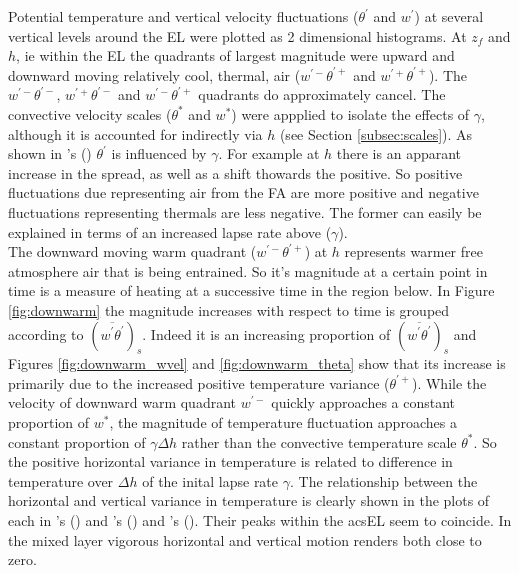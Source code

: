 Potential temperature and vertical velocity fluctuations ($\theta^{'}$ and $w^{'}$) at several vertical levels around the \acs{EL} were plotted as 2 dimensional histograms.  At $z_{f}$ and $h$, ie within the \acs{EL} the quadrants of largest magnitude were upward and downward moving relatively cool, thermal,  air ($w^{'-}\theta^{'+}$ and $w^{'+}\theta^{'+}$). The $w^{'-}\theta^{'-}$, $w^{'+}\theta^{'-}$ and $w^{'-}\theta^{'+}$ quadrants do approximately cancel.  The convective velocity scales ($\theta^{*}$ and $w^{*}$) were appplied to isolate the effects of $\gamma$, although it is accounted for indirectly via $h$ (see Section \ref{subsec:scales}). As shown in \citeauthor{Sorbjan}'s (\citeyear{Sorbjan}) $\theta^{'}$ is influenced  by $\gamma$.  For example at $h$ there is an apparant increase in the spread, as well as a shift thowards the positive.  So positive fluctuations due representing air from the \acs{FA} are more positive and negative fluctuations representing thermals are less negative.  The former can easily be explained in terms of an increased lapse rate above ($\gamma$).\\

The downward moving warm quadrant ($w^{'-}\theta^{'+}$) at $h$ represents warmer free atmosphere air that is being entrained.  So it's magnitude at a certain point in time is a measure of heating at a successive time in the region below.  In Figure \ref{fig:downwarm} the magnitude increases with respect to time is grouped according to $(\overline{w^{'}\theta^{'}})_{s}$.  Indeed it is an increasing proportion of  $(\overline{w^{'}\theta^{'}})_{s}$ and Figures \ref{fig:downwarm_wvel} and \ref{fig:downwarm_theta} show that its increase is primarily due to the increased positive temperature variance ($\theta^{'+}$).  While the velocity of downward warm quadrant $w^{'-}$ quickly approaches a constant proportion of $w^{*}$, the magnitude of temperature fluctuation approaches a constant proportion of $\gamma \Delta h$ rather than the convective temperature scale $\theta^{*}$.  So the positive horizontal variance in temperature is related to difference in temperature over $\Delta h$ of the inital lapse rate $\gamma$.  The relationship between the horizontal and vertical variance in temperature is clearly shown in the plots of each in \citeauthor{Sorbjan}'s (\citeyear{Sorbjan}) and \citeauthor{SullMoengStev}'s (\citeyear{SullMoengStev}) and \citeauthor{GarciaMellado}'s (\citeyear{GarciaMellado}). Their peaks within the acs{EL} seem to coincide.  In the mixed layer vigorous horizontal and vertical motion renders both close to zero.\\             

